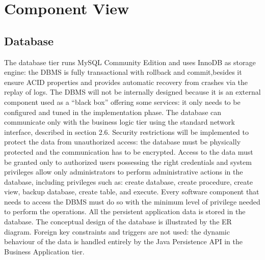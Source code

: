 \section{Component View}
\subsection{Database}
The database tier runs MySQL Community Edition and uses InnoDB as storage engine: the DBMS is fully transactional with rollback and commit,besides it ensure ACID properties and provides automatic recovery from crashes via the replay of logs. The DBMS will not be internally designed because it is an external component used as a “black box” offering some services: it only needs to be configured and tuned in the implementation phase. The database can communicate only with the business logic tier using the standard network interface, described in section 2.6. Security restrictions will be implemented to protect the data from unauthorized access: the database must be physically protected and the communication has to be encrypted. Access to the data must be granted only to authorized users possessing the right credentials and system privileges allow only administrators to perform administrative actions in the database, including privileges such as: create database, create procedure, create view, backup database, create table, and execute. Every software component that needs to access the DBMS must do so with the minimum level of privilege needed to perform the operations. All the persistent application data is stored in the database. The conceptual design of the database is illustrated by the ER diagram. Foreign key constraints and triggers are not used: the dynamic behaviour of the data is handled entirely by the Java Persistence API in the Business Application tier.





